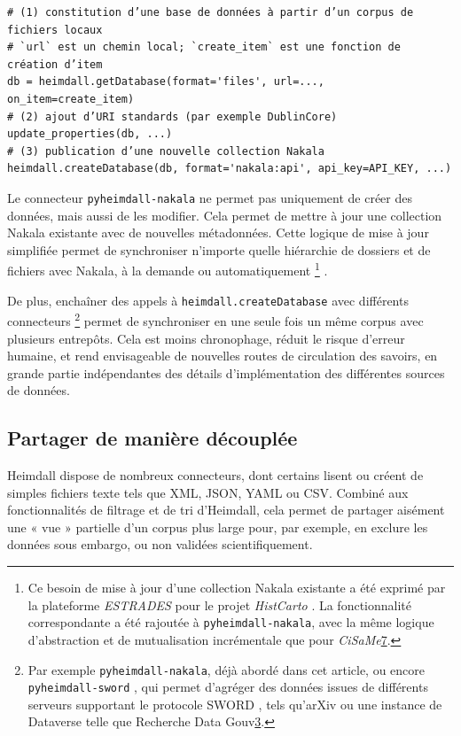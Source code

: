 \documentclass[final,fra]{anthology-ch}         %
\begin{document}
\begin{verbatim}
# (1) constitution d’une base de données à partir d’un corpus de fichiers locaux
# `url` est un chemin local; `create_item` est une fonction de création d’item
db = heimdall.getDatabase(format='files', url=..., on_item=create_item)
# (2) ajout d’URI standards (par exemple DublinCore)
update_properties(db, ...)
# (3) publication d’une nouvelle collection Nakala
heimdall.createDatabase(db, format='nakala:api', api_key=API_KEY, ...)
\end{verbatim}

Le connecteur \texttt{pyheimdall-nakala} ne permet pas uniquement de créer des données, mais aussi de les modifier. Cela permet de mettre à jour une collection Nakala existante avec de nouvelles métadonnées. Cette logique de mise à jour simplifiée permet de synchroniser n'importe quelle hiérarchie de dossiers et de fichiers avec Nakala, à la demande ou automatiquement%
    \footnote{Ce besoin de mise à jour d'une collection Nakala existante a été exprimé par la plateforme \emph{ESTRADES} \autocite{estrades} pour le projet \emph{HistCarto} \autocite{histcarto}. La fonctionnalité correspondante a été rajoutée à \texttt{pyheimdall-nakala}, avec la même logique d'abstraction et de mutualisation incrémentale que pour \emph{CiSaMe}\hyperref[cisame]{7}.}%
.

De plus, enchaîner des appels à \texttt{heimdall.createDatabase} avec différents connecteurs%
    \footnote{Par exemple \texttt{pyheimdall-nakala}, déjà abordé dans cet article, ou encore \texttt{pyheimdall-sword} \autocite{pyheimdall-sword}, qui permet d'agréger des données issues de différents serveurs supportant le protocole SWORD \autocite{sword}, tels qu'arXiv ou une instance de Dataverse telle que Recherche Data Gouv\hyperref[rdg]{3}.}
permet de synchroniser en une seule fois un même corpus avec plusieurs entrepôts. Cela est moins chronophage, réduit le risque d'erreur humaine, et rend envisageable de nouvelles routes de circulation des savoirs, en grande partie indépendantes des détails d'implémentation des différentes sources de données.

\subsection{Partager de manière découplée}\label{partager-de-maniuxe8re-duxe9coupluxe9e}

Heimdall dispose de nombreux connecteurs, dont certains lisent ou créent de simples fichiers texte tels que XML, JSON, YAML ou CSV. Combiné aux fonctionnalités de filtrage et de tri d'Heimdall, cela permet de partager aisément une « vue » partielle d'un corpus plus large pour, par exemple, en exclure les données sous embargo, ou non validées scientifiquement.
\end{document}
